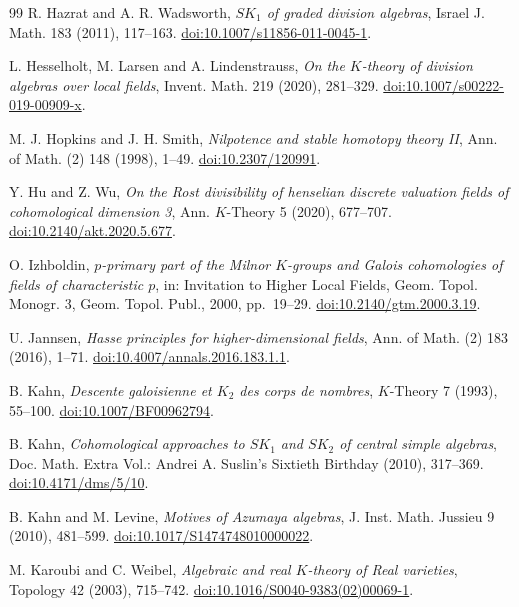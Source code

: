 \begin{thebibliography}{99}
 R. Hazrat and A. R. Wadsworth,
\emph{$SK_1$ of graded division algebras},
Israel J. Math. 183 (2011), 117--163.
\href{https://doi.org/10.1007/s11856-011-0045-1}{doi:10.1007/s11856-011-0045-1}.

 L. Hesselholt, M. Larsen and A. Lindenstrauss,
\emph{On the $K$-theory of division algebras over local fields},
Invent. Math. 219 (2020), 281--329.
\href{https://doi.org/10.1007/s00222-019-00909-x}{doi:10.1007/s00222-019-00909-x}.

 M. J. Hopkins and J. H. Smith,
\emph{Nilpotence and stable homotopy theory II},
Ann. of Math. (2) 148 (1998), 1--49.
\href{https://doi.org/10.2307/120991}{doi:10.2307/120991}.

 Y. Hu and Z. Wu,
\emph{On the Rost divisibility of henselian discrete valuation fields of cohomological dimension 3},
Ann. $K$-Theory 5 (2020), 677--707.
\href{https://doi.org/10.2140/akt.2020.5.677}{doi:10.2140/akt.2020.5.677}.

 O. Izhboldin,
\emph{\(p\)-primary part of the Milnor \(K\)-groups and Galois cohomologies of fields of characteristic \(p\)},
in: Invitation to Higher Local Fields, Geom. Topol. Monogr. 3, Geom. Topol. Publ., 2000, pp.~19--29.
\href{https://doi.org/10.2140/gtm.2000.3.19}{doi:10.2140/gtm.2000.3.19}.

 U. Jannsen,
\emph{Hasse principles for higher-dimensional fields},
Ann. of Math. (2) 183 (2016), 1--71.
\href{https://doi.org/10.4007/annals.2016.183.1.1}{doi:10.4007/annals.2016.183.1.1}.

 B. Kahn,
\emph{Descente galoisienne et \(K_2\) des corps de nombres},
\(K\)-Theory 7 (1993), 55--100.
\href{https://doi.org/10.1007/BF00962794}{doi:10.1007/BF00962794}.

 B. Kahn,
\emph{Cohomological approaches to $SK_1$ and $SK_2$ of central simple algebras},
Doc. Math. Extra Vol.: Andrei A. Suslin's Sixtieth Birthday (2010), 317--369.
\href{https://doi.org/10.4171/dms/5/10}{doi:10.4171/dms/5/10}.

 B. Kahn and M. Levine,
\emph{Motives of Azumaya algebras},
J. Inst. Math. Jussieu 9 (2010), 481--599.
\href{https://doi.org/10.1017/S1474748010000022}{doi:10.1017/S1474748010000022}.

 M. Karoubi and C. Weibel,
\emph{Algebraic and real $K$-theory of Real varieties},
Topology 42 (2003), 715--742.
\href{https://doi.org/10.1016/S0040-9383(02)00069-1}{doi:10.1016/S0040-9383(02)00069-1}.


\end{thebibliography}
